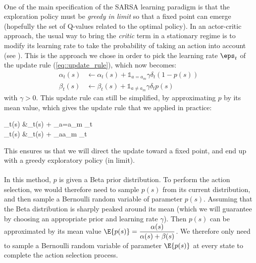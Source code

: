 \documentclass[a4paper]{report}
\begin{document}
{{{{				\paragraph{} One of the main specification of the SARSA learning paradigm is that the exploration policy must be \emph{greedy in limit} so that a fixed point can emerge (hopefully the set of Q-values related to the optimal policy). In an actor-critic approach, the usual way to bring the \emph{critic} term in a stationary regime is to modify its learning rate to take the probability of taking an action into account (see \cite{Sutton98a}). \newline
				This is the approach we chose in order to pick the learning rate $\eps_t$ of the update rule (\ref{eq::update_rule}), which now becomes: 
			\begin{equation}
				\begin{aligned}
					\alpha_t(s) &\leftarrow \alpha_t(s) +  \mathds{1}_{a=a_m}\gamma \delta_t(1- p(s))\\
					\beta_t(s) &\leftarrow \beta_t(s) +   \mathds{1}_{a\neq a_m}\gamma \delta_t p(s)
				\end{aligned}
			\end{equation}
			with $\gamma >0$. This update rule can still be simplified, by approximating $p$ by its mean value, which gives the update rule that we applied in practice: 
			{
				\begin{aligned}
					\alpha_t(s) &\leftarrow \alpha_t(s) +  _{a=a_m} \delta_t \\
					\beta_t(s) &\leftarrow \beta_t(s) +   _{a\neq a_m}  \delta_t
				\end{aligned}
			}
			This ensures us that we will direct the update toward a fixed point, and end up with a greedy exploratory policy (in limit). 
			
			\paragraph{} In this method, $p$ is given a Beta prior distribution. To perform the action selection, we would therefore need to sample $p(s)$ from its current distribution, and then sample a Bernoulli random variable of parameter $p(s)$. Assuming that the Beta distribution is sharply peaked around its mean (which we will guarantee by choosing an appropriate prior and learning rate $\gamma$). Then $p(s)$ can be approximated by its mean value $\E{p(s)} = \displaystyle\frac{\alpha(s)}{\alpha(s) + \beta(s)}$. We therefore only need to sample a Bernoulli random variable of parameter $\E{p(s)}$ at every state to complete the action selection process. 
			
}}}}
\end{document}
